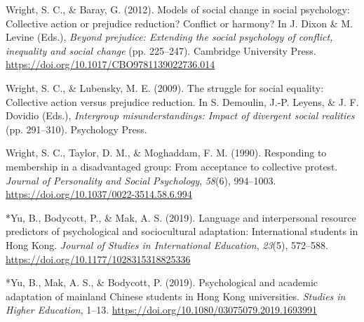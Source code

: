 \documentclass[12pt, letterpaper]{article}
\newenvironment{CSLReferences}[2]{}{}
\begin{document}
\begin{CSLReferences}{1}{0}
\leavevmode\hypertarget{ref-dixon_models_2012}{}%
Wright, S. C., \& Baray, G. (2012). Models of social change in social
psychology: {Collective} action or prejudice reduction? {Conflict} or
harmony? In J. Dixon \& M. Levine (Eds.), \emph{Beyond prejudice:
{Extending} the social psychology of conflict, inequality and social
change} (pp. 225--247). Cambridge University Press.
\url{https://doi.org/10.1017/CBO9781139022736.014}

\leavevmode\hypertarget{ref-wright_struggle_2009}{}%
Wright, S. C., \& Lubensky, M. E. (2009). The struggle for social
equality: {Collective} action versus prejudice reduction. In S.
Demoulin, J.-P. Leyens, \& J. F. Dovidio (Eds.), \emph{Intergroup
misunderstandings: {Impact} of divergent social realities} (pp.
291--310). Psychology Press.

\leavevmode\hypertarget{ref-wright_responding_1990}{}%
Wright, S. C., Taylor, D. M., \& Moghaddam, F. M. (1990). Responding to
membership in a disadvantaged group: {From} acceptance to collective
protest. \emph{Journal of Personality and Social Psychology},
\emph{58}(6), 994--1003.
\url{https://doi.org/10.1037/0022-3514.58.6.994}

\leavevmode\hypertarget{ref-1395}{}%
*Yu, B., Bodycott, P., \& Mak, A. S. (2019). Language and interpersonal
resource predictors of psychological and sociocultural adaptation:
International students in {Hong} {Kong}. \emph{Journal of Studies in
International Education}, \emph{23}(5), 572--588.
\url{https://doi.org/10.1177/1028315318825336}

\leavevmode\hypertarget{ref-3000}{}%
*Yu, B., Mak, A. S., \& Bodycott, P. (2019). Psychological and academic
adaptation of mainland {Chinese} students in {Hong} {Kong} universities.
\emph{Studies in Higher Education}, 1--13.
\url{https://doi.org/10.1080/03075079.2019.1693991}

\end{CSLReferences}

\endgroup
\end{document}
